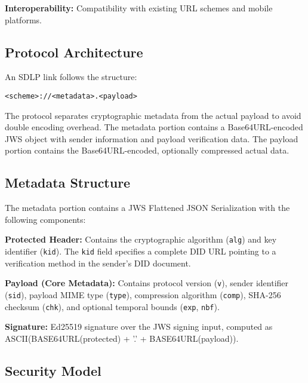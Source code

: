 \documentclass[conference]{IEEEtran}
\begin{document}
\textbf{Interoperability:} Compatibility with existing URL schemes and mobile platforms.

\subsection{Protocol Architecture}

An SDLP link follows the structure:
\begin{center}
\texttt{<scheme>://<metadata>.<payload>}
\end{center}

The protocol separates cryptographic metadata from the actual payload to avoid double encoding overhead. The metadata portion contains a Base64URL-encoded JWS object with sender information and payload verification data. The payload portion contains the Base64URL-encoded, optionally compressed actual data.


\subsection{Metadata Structure}

The metadata portion contains a JWS Flattened JSON Serialization with the following components:

\textbf{Protected Header:} Contains the cryptographic algorithm (\texttt{alg}) and key identifier (\texttt{kid}). The \texttt{kid} field specifies a complete DID URL pointing to a verification method in the sender's DID document.

\textbf{Payload (Core Metadata):} Contains protocol version (\texttt{v}), sender identifier (\texttt{sid}), payload MIME type (\texttt{type}), compression algorithm (\texttt{comp}), SHA-256 checksum (\texttt{chk}), and optional temporal bounds (\texttt{exp}, \texttt{nbf}).

\textbf{Signature:} Ed25519 signature over the JWS signing input, computed as ASCII(BASE64URL(protected) + '.' + BASE64URL(payload)).

\subsection{Security Model}
\end{document}
